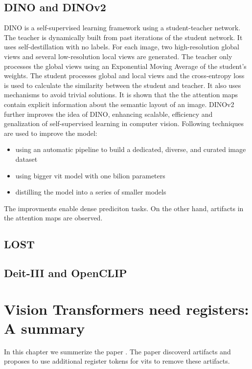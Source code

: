 \documentclass[conference]{IEEEtran}
\begin{document}
  \subsection{DINO and DINOv2}
  \cite{dino} \cite{dinov2}
  DINO is a self-supervised learning framework using a student-teacher network. The teacher is dynamically built from past iterations of the student network. It uses self-destillation with no labels. For each image, two high-resolution global views and several low-resolution local views are generated. The teacher only processes the global views using an Exponential Moving Average of the student's weights. The student processes global and local views and the cross-entropy loss is used to calculate the similarity between the student and teacher. It also uses mechanisms to avoid trivial solutions. \cite{dino} It is shown that the the attention maps contain explicit information about the semantic layout of an image. \cite{registers}
  DINOv2 further improves the idea of DINO, enhancing scalable, efficiency and genalization of self-supervised learning in computer vision. Following techniques are used to improve the model:
  \begin{itemize}
    \item  using an automatic pipeline to build a dedicated, diverse, and curated image dataset
    \item  using bigger \ac{vit} model with one bilion parameters
    \item distilling the model into a series of smaller models \cite{dinov2}
  \end{itemize}
  The improvments enable dense prediciton tasks. On the other hand, artifacts in the attention maps are observed. \cite{registers}

  \subsection{LOST}
  \cite{lost}
  \subsection{Deit-III and OpenCLIP}
  \cite{deit3} \cite{open-clip}


  \section{Vision Transformers need registers: A summary}

  In this chapter we summerize the paper \cite{registers}. The paper discoverd artifacts and proposes to use additional register tokens for \acp{vit} to remove these artifacts.
\end{document}
